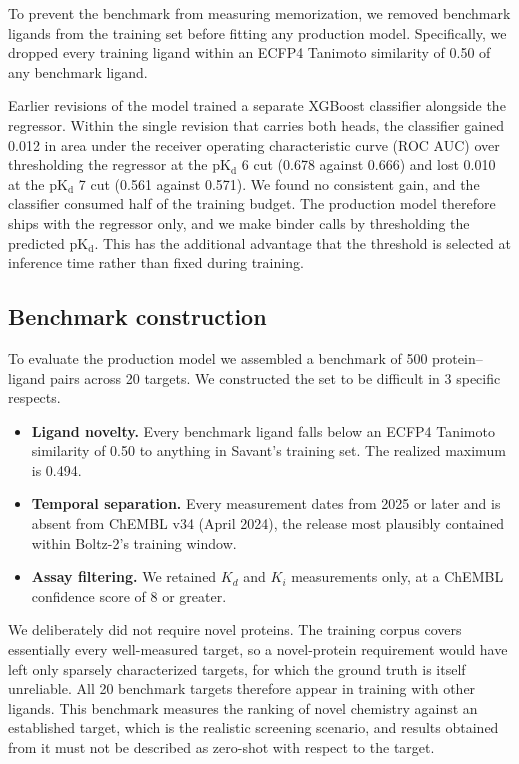 \documentclass[11pt]{article}
\newcommand{\pkd}{\ensuremath{\mathrm{pK_d}}}
\begin{document}
To prevent the benchmark from measuring memorization, we removed benchmark
ligands from the training set before fitting any production model.
Specifically, we dropped every training ligand within an ECFP4 Tanimoto
similarity of 0.50 of any benchmark ligand.

Earlier revisions of the model trained a separate XGBoost classifier alongside
the regressor. Within the single revision that carries both heads, the
classifier gained 0.012 in area under the receiver operating characteristic
curve (ROC AUC) over thresholding the regressor at the \pkd{} 6 cut (0.678
against 0.666) and lost 0.010 at the \pkd{} 7 cut (0.561 against 0.571). We
found no consistent gain, and the classifier consumed half of the training
budget. The production model therefore ships with the regressor only, and we
make binder calls by thresholding the predicted \pkd. This has the additional
advantage that the threshold is selected at inference time rather than fixed
during training.

\subsection{Benchmark construction}
\label{sec:bench-methods}

To evaluate the production model we assembled a benchmark of 500
protein--ligand pairs across 20 targets. We constructed the set to be difficult
in 3 specific respects.

\begin{itemize}
  \item \textbf{Ligand novelty.} Every benchmark ligand falls below an ECFP4
        Tanimoto similarity of 0.50 to anything in Savant's training set. The
        realized maximum is 0.494.
  \item \textbf{Temporal separation.} Every measurement dates from 2025 or
        later and is absent from ChEMBL v34 (April 2024), the release most
        plausibly contained within Boltz-2's training window.
  \item \textbf{Assay filtering.} We retained $K_d$ and $K_i$ measurements only,
        at a ChEMBL confidence score of 8 or greater.
\end{itemize}

We deliberately did not require novel proteins. The training corpus covers
essentially every well-measured target, so a novel-protein requirement would
have left only sparsely characterized targets, for which the ground truth is
itself unreliable. All 20 benchmark targets therefore appear in training with
other ligands. This benchmark measures the ranking of novel chemistry against
an established target, which is the realistic screening scenario, and results
obtained from it must not be described as zero-shot with respect to the target.
\end{document}
